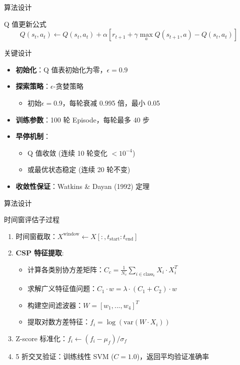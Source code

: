 \documentclass[aspectratio=169, 10pt]{beamer}
\begin{document}
\begin{frame}{算法设计}
\begin{block}{Q 值更新公式}
$$Q(s_t, a_t) \leftarrow Q(s_t, a_t) + \alpha \left[ r_{t+1} + \gamma \max_{a} Q(s_{t+1}, a) - Q(s_t, a_t) \right]$$
\end{block}

\vspace{0.3cm}
\begin{block}{关键设计}
\begin{itemize}
    \item \textbf{初始化}：Q 值表初始化为零，$\epsilon = 0.9$
    \item \textbf{探索策略}：$\epsilon$-贪婪策略
    \begin{itemize}
        \item 初始$\epsilon = 0.9$，每轮衰减 0.995 倍，最小 0.05
    \end{itemize}
    \item \textbf{训练参数}：100 轮 Episode，每轮最多 40 步
    \item \textbf{早停机制}：
    \begin{itemize}
        \item Q 值收敛 (连续 10 轮变化 $< 10^{-4}$)
        \item 或最优状态稳定 (连续 20 轮不变)
    \end{itemize}
    \item \textbf{收敛性保证}：Watkins \& Dayan (1992) 定理
\end{itemize}
\end{block}
\end{frame}

\begin{frame}{算法设计}
\begin{block}{时间窗评估子过程}
\begin{enumerate}
    \item 时间窗截取：$X^{\text{window}} \leftarrow X[:, t_{\text{start}}:t_{\text{end}}]$
    \item \textbf{CSP 特征提取}:
    \begin{itemize}
        \item 计算各类别协方差矩阵：$C_c = \frac{1}{N_c} \sum_{i \in \text{class}_c} X_i \cdot X_i^T$
        \item 求解广义特征值问题：$C_1 \cdot w = \lambda \cdot (C_1 + C_2) \cdot w$
        \item 构建空间滤波器：$W = [w_1, ..., w_4]^T$
        \item 提取对数方差特征：$f_i = \log(\text{var}(W \cdot X_i))$
    \end{itemize}
    \item Z-score 标准化：$f_i \leftarrow (f_i - \mu_f) / \sigma_f$
    \item 5 折交叉验证：训练线性 SVM ($C=1.0$)，返回平均验证准确率
\end{enumerate}
\end{block}
\end{frame}
\end{document}

